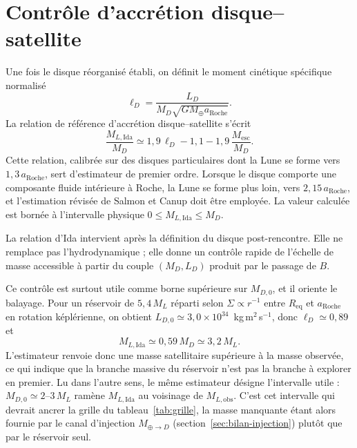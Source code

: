 \documentclass[11pt,a4paper,openany]{report}
\newcommand{\Mt}{M_{\oplus}}
\newcommand{\Req}{R_{\mathrm{eq}}}
\newcommand{\aR}{a_{\mathrm{Roche}}}
\begin{document}
\section{Contrôle d'accrétion disque--satellite}

Une fois le disque réorganisé établi, on définit le moment cinétique spécifique normalisé
\begin{equation}
\ell_D=\frac{L_D}{M_D\sqrt{G\Mt\aR}}.
\label{eq:lD}
\end{equation}
La relation de référence d'accrétion disque--satellite \cite{Ida1997} s'écrit
\begin{equation}
\frac{M_{L,\mathrm{Ida}}}{M_D}\simeq1{,}9\,\ell_D-1{,}1-1{,}9\,\frac{M_{\mathrm{esc}}}{M_D}.
\label{eq:Ida}
\end{equation}
Cette relation, calibrée sur des disques particulaires dont la Lune se forme vers $1{,}3\,\aR$,
sert d'estimateur de premier ordre. Lorsque le disque comporte une composante fluide
intérieure à Roche, la Lune se forme plus loin, vers $2{,}15\,\aR$, et l'estimation révisée de
Salmon et Canup \cite{SalmonCanup2012} doit être employée. La valeur calculée est bornée à
l'intervalle physique $0\le M_{L,\mathrm{Ida}}\le M_D$.

\begin{lecture}
La relation d'Ida intervient après la définition du disque post-rencontre. Elle ne remplace pas
l'hydrodynamique ; elle donne un contrôle rapide de l'échelle de masse accessible à partir du
couple $(M_D,L_D)$ produit par le passage de $B$.
\end{lecture}

\begin{controle}
Ce contrôle est surtout utile comme borne supérieure sur $M_{D,0}$, et il oriente le balayage.
Pour un réservoir de $5{,}4\,M_L$ réparti selon $\Sigma\propto r^{-1}$ entre $\Req$ et $\aR$ en
rotation képlérienne, on obtient $L_{D,0}\simeq3{,}0\times10^{34}$~kg\,m$^2$\,s$^{-1}$, donc
$\ell_D\simeq0{,}89$ et
\begin{equation}
M_{L,\mathrm{Ida}}\simeq0{,}59\,M_D\simeq3{,}2\,M_L.
\label{eq:controle-Ida}
\end{equation}
L'estimateur renvoie donc une masse satellitaire supérieure à la masse observée, ce qui indique que
la branche massive du réservoir n'est pas la branche à explorer en premier. Lu dans l'autre sens, le
même estimateur désigne l'intervalle utile : $M_{D,0}\simeq2$--$3\,M_L$ ramène
$M_{L,\mathrm{Ida}}$ au voisinage de $M_{L,\mathrm{obs}}$. C'est cet intervalle qui devrait ancrer
la grille du tableau~\ref{tab:grille}, la masse manquante étant alors fournie par le canal
d'injection $M_{\oplus\to D}$ (section~\ref{sec:bilan-injection}) plutôt que par le réservoir seul.
\end{controle}
\end{document}
